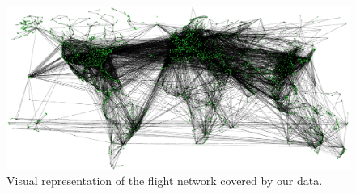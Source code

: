 \documentclass{Template resources/netsci-project}
\begin{document}
\begin{figure}[!ht]
    \centering
    \includegraphics[width=\linewidth]{Figures/final_network.pdf}
    \caption{Visual representation of the flight network covered by our data.}
    \label{fig:final_network}
\end{figure}

\end{document}

